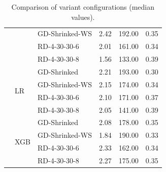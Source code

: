 \begin{table}[ht]
\begin{tabular}{lllrrr}
		                          &                       & GD-Shrinked-WS   & 2.42         & 192.00              & 0.35                    \\\cline{3-6}
		                          &                       & RD-4-30-30-6     & 2.01         & 161.00              & 0.34                    \\\cline{3-6}
		                          &                       & RD-4-30-30-8     & 1.56         & 133.00              & 0.39                    \\\cline{2-6}
		                          & \multirow{4}{*}{LR}   & GD-Shrinked      & 2.21         & 193.00              & 0.30                    \\\cline{3-6}
		                          &                       & GD-Shrinked-WS   & 2.15         & 174.00              & 0.34                    \\\cline{3-6}
		                          &                       & RD-4-30-30-6     & 2.10         & 171.00              & 0.37                    \\\cline{3-6}
		                          &                       & RD-4-30-30-8     & 2.05         & 141.00              & 0.39                    \\\cline{2-6}
		                          & \multirow{4}{*}{XGB}  & GD-Shrinked      & 2.08         & 178.00              & 0.35                    \\\cline{3-6}
		                          &                       & GD-Shrinked-WS   & 1.84         & 190.00              & 0.33                    \\\cline{3-6}
		                          &                       & RD-4-30-30-6     & 2.33         & 162.00              & 0.34                    \\\cline{3-6}
		                          &                       & RD-4-30-30-8     & 2.27         & 175.00              & 0.35                    \\
		\bottomrule
	\end{tabular}
	\caption{Comparison of variant configurations (median values).}
\end{table}

\clearpage


